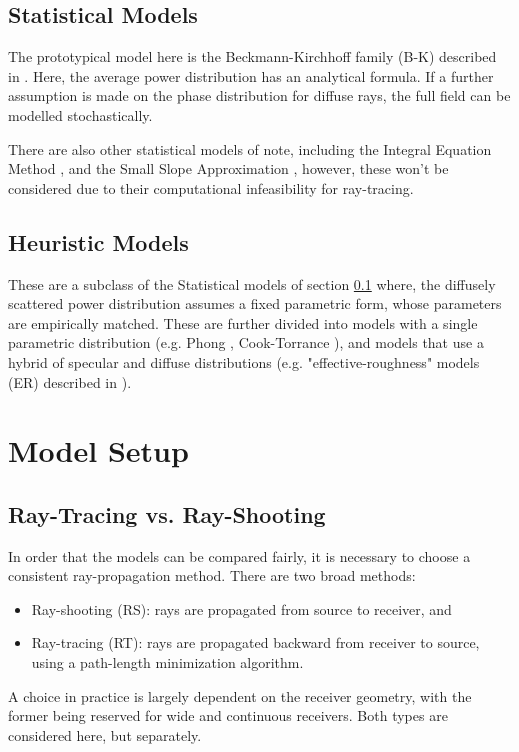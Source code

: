 \documentclass[lettersize,journal]{IEEEtran}
\begin{document}
\subsection{Statistical Models}\label{sec:StatisticalModels}
The prototypical model here is the Beckmann-Kirchhoff family (B-K) described in
\cite{ref:Beckmann}. Here, the average power distribution has an analytical formula.
If a further assumption is made on the phase distribution for diffuse rays, the full
field can be modelled stochastically.

There are also other statistical models of note, including the Integral Equation
Method \cite{ref:IEM}, and the Small Slope Approximation \cite{ref:SSA}, however,
these won't be considered due to their computational infeasibility for ray-tracing.

\subsection{Heuristic Models}
These are a subclass of the Statistical models of section
\ref{sec:StatisticalModels} where, the diffusely scattered power
distribution assumes a fixed parametric form, whose parameters are empirically
matched. These are further divided into models with a single parametric distribution
(e.g. Phong \cite{ref:Phong}, Cook-Torrance \cite{ref:Cook-Torrance}), and models
that use a hybrid of specular and diffuse distributions (e.g. "effective-roughness"
models (ER) described in \cite{ref:ER2}).
\section{Model Setup}
\subsection{Ray-Tracing vs. Ray-Shooting}
In order that the models can be compared fairly, it is necessary to choose a
consistent ray-propagation method. There are two broad methods: 
\begin{itemize}
   \item Ray-shooting (RS): rays are propagated from source to receiver, and
   \item Ray-tracing (RT): rays are propagated backward from receiver to source,
      using a path-length minimization algorithm. 
\end{itemize}
A choice in practice is largely dependent on the receiver geometry, with the former
being reserved for wide and continuous receivers. Both types are considered here, but
separately. %
\end{document}
